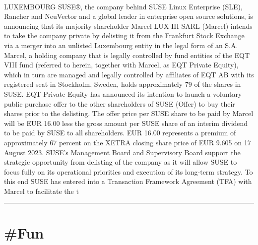 \documentclass[10pt,a4paper]{article}
\begin{document}
\begin{multicols}{2}
\paragraph{}
LUXEMBOURG
SUSE®, the company behind SUSE Linux Enterprise (SLE), Rancher and NeuVector and a global leader in enterprise open source solutions, is announcing that its majority shareholder Marcel LUX III SARL (Marcel) intends to take the company private by delisting it from the Frankfurt Stock Exchange via a merger into an unlisted Luxembourg entity in the legal form of an S.A.
Marcel, a holding company that is legally controlled by fund entities of the EQT VIII fund (referred to herein, together with Marcel, as EQT Private Equity), which in turn are managed and legally controlled by affiliates of EQT AB with its registered seat in Stockholm, Sweden, holds approximately 79 of the shares in SUSE.
EQT Private Equity has announced its intention to launch a voluntary public purchase offer to the other shareholders of SUSE (Offer) to buy their shares prior to the delisting. The offer price per SUSE share to be paid by Marcel will be EUR 16.00 less the gross amount per SUSE share of an interim dividend to be paid by SUSE to all shareholders. EUR 16.00 represents a premium of approximately 67 percent on the XETRA closing share price of EUR 9.605 on 17 August 2023.
SUSE’s Management Board and Supervisory Board support the strategic opportunity from delisting of the company as it will allow SUSE to focus fully on its operational priorities and execution of its long-term strategy. To this end SUSE has entered into a Transaction Framework Agreement (TFA) with Marcel to facilitate the t
\par\noindent\textcolor{red}{\rule{\linewidth}{0.2mm}}
\vfill
\null
\end{multicols}

\newpage
\section{\#Fun}
\end{document}
